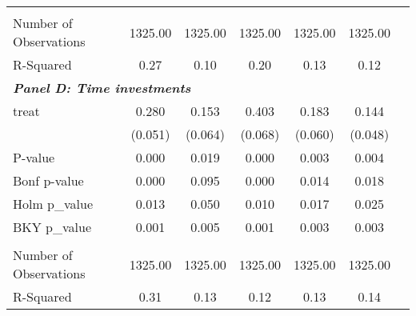 {\begin{tabular}{l*{6}{c}}
&                     &                     &                     &                     &                     \\
Number of Observations&     1325.00         &     1325.00         &     1325.00         &     1325.00         &     1325.00         \\
R-Squared           &        0.27         &        0.10         &        0.20         &        0.13         &        0.12         \\
\hline
\multicolumn{6}{l}{\linebreak \textbf{\textit{Panel D: Time investments}}} \\
treat               &       0.280\sym{***}&       0.153\sym{*}  &       0.403\sym{***}&       0.183\sym{**} &       0.144\sym{**} \\
&     (0.051)         &     (0.064)         &     (0.068)         &     (0.060)         &     (0.048)         \\
\hline
P-value             &       0.000         &       0.019         &       0.000         &       0.003         &       0.004         \\
Bonf p-value        &       0.000         &       0.095         &       0.000         &       0.014         &       0.018         \\
Holm p\_value        &       0.013         &       0.050         &       0.010         &       0.017         &       0.025         \\
BKY p\_value         &       0.001         &       0.005         &       0.001         &       0.003         &       0.003         \\
&                     &                     &                     &                     &                     \\
Number of Observations&     1325.00         &     1325.00         &     1325.00         &     1325.00         &     1325.00         \\
R-Squared           &        0.31         &        0.13         &        0.12         &        0.13         &        0.14         \\
\hline\hline
\end{tabular}
}
